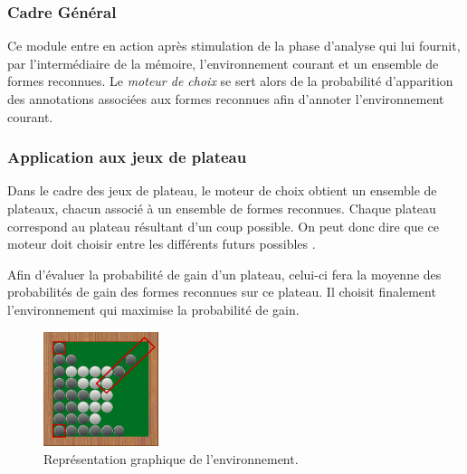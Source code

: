 \subsubsection{Cadre Général}

Ce module entre en action après stimulation de la phase d'analyse qui lui fournit, par l'intermédiaire de la mémoire, l'environnement courant et un ensemble de formes reconnues. Le \emph{moteur de choix} se sert alors de la probabilité d'apparition des annotations associées aux formes reconnues afin d'annoter l'environnement courant.

\subsubsection{Application aux jeux de plateau}

Dans le cadre des jeux de plateau, le moteur de choix obtient un ensemble de plateaux, chacun associé à un ensemble de formes reconnues. Chaque plateau correspond au plateau résultant d'un coup possible. On peut donc dire que ce moteur doit choisir entre les différents \og futurs possibles \fg{}.

Afin d'évaluer la probabilité de gain d'un plateau, celui-ci fera la moyenne des probabilités de gain des formes reconnues sur ce plateau. Il choisit finalement l'environnement qui maximise la probabilité de gain.

\begin{figure}[H] 
  \begin{center}
		\includegraphics[width=0.3\textwidth]{files/raisonneur/moteur_de_choix} 
	\end{center}
\caption{Représentation graphique de l'environnement.} 
\label{img_env}
\end{figure}
